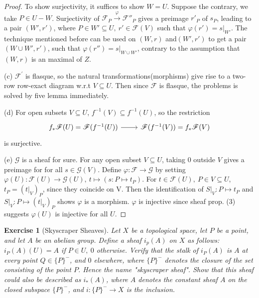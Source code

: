 \documentclass{amsart}
\newtheorem{exe}{Exercise}[subsection]
\begin{document}
\begin{proof}
	To show surjectivity, it suffices to show $W=U$. Suppose the contrary, we take $P\in U-W$. Surjectivity of $\mathscr{F}_P\xrightarrow{\varphi} \mathscr{F}''_P$ gives a preimage $r'_P$ of $s_P$, leading to a pair $(W',r')$, where $P\in W'\subseteq U,\ r'\in \mathscr{F}(V)$ such that $\varphi(r')=s|_{W'}$. The technique mentioned before can be used on $(W,r)$ and$(W',r')$ to get a pair $(W\cup W',r')$, such that $\varphi(r'')=s|_{W\cup W'}$, contrary to the assumption that $(W,r)$ is an maximal of $Z$.
	
	(c) $\mathscr{F}^{'}$ is flasque, so the natural transformations(morphisms) give rise to a two-row row-exact diagram w.r.t $V\subseteq U$. Then since $\mathscr{F}$ is flasque, the problems is solved by five lemma immediately.
	
	(d) For open subsets $V\subseteq U$, $f^{-1}(V)\subseteq f^{-1}(U)$, so the restriction
	\begin{equation*}
		\begin{tikzcd}
			f_{*}\mathscr{F}(U)=\mathscr{F}(f^{-1}(U)) \arrow[r] & \mathscr{F}(f^{-1}(V))=f_*\mathscr{F}(V)
		\end{tikzcd}
	\end{equation*}
	is surjective.
	
	(e) $\mathscr{G}$ is a sheaf for sure. For any open subset $V\subseteq U$, taking $0$ outside $V$ gives a preimage for for all $s \in \mathscr{G}(V)$. Define $\varphi: \mathscr{F}\rightarrow \mathscr{G}$ by setting $\varphi(U): \mathscr{F}(U)\rightarrow \mathscr{G}(U),\ t\mapsto (s: P \mapsto t_P)$. For $t\in \mathscr{F}(U),\ P\in V\subseteq U$, $t_P=(t|_V)_P$, since they coincide on V. Then the identification of $S|_V: P\mapsto t_P$ and $S|_V: P\mapsto (t|_V)_P$ shows $\varphi$ is a morphism. $\varphi$ is injective since sheaf prop. (3) suggests $\varphi(U)$ is injective for all $U$.
\end{proof}

\begin{exe}[Skyscraper Sheaves]
	\label{2.1.17}
	Let $X$ be a topological space, let $P$ be a point, and let $A$ be an abelian group. Define a sheaf $i_p(A)$ on $X$ as follows: $i_P(A)(U)=A$ if $P\in U,\ 0$ otherwise. Verify that the stalk of $i_P(A)$ is $A$ at every point $Q\in \{P\}^-$, and $0$ elsewhere, where $\{P\}^-$ denotes the closure of the set consisting of the point $P$. Hence the name "skyscraper sheaf". Show that this sheaf could also be described as $i_*(A)$, where $A$ denotes the constant sheaf $A$ on the closed subspace $\{P\}^-$, and $i:\{P\}^-\rightarrow X$ is the inclusion.
	
\end{exe}
\end{document}
